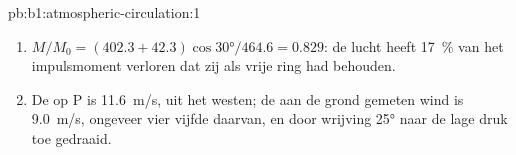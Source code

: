\begin{solution}{pb:b1:atmospheric-circulation:1}
\begin{enumerate}
  \item $M/M_0 = (402.3 + 42.3)\cos\ang{30}/464.6 = 0.829$: de lucht heeft
        \qty{17}{\percent} van het impulsmoment verloren dat zij als vrije ring had behouden.
  \item De  op P is \qty{11.6}{m/s}, uit het westen; de aan de grond gemeten wind is \qty{9.0}{m/s}, ongeveer vier vijfde daarvan, en door wrijving \ang{25} naar de lage druk toe gedraaid.
\end{enumerate}
\end{solution}
